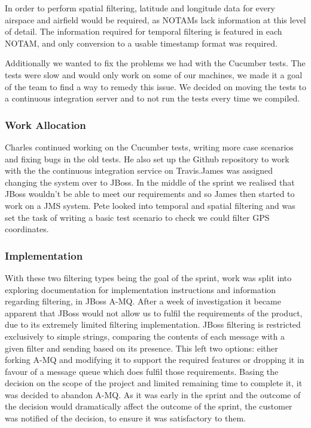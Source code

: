\documentclass[a4paper, 12pt]{article}
\begin{document}
In order to perform spatial filtering, latitude and longitude data for every airspace and airfield would be required, as NOTAMs lack information at this level of detail. The information required for temporal filtering is featured in each NOTAM, and only conversion to a usable timestamp format was required.

Additionally we wanted to fix the problems we had with the Cucumber tests. The tests were slow and would only work on some of our machines, we made it a goal of the team to find a way to remedy this issue. We decided on moving the tests to a continuous integration server and to not run the tests every time we compiled.

\subsubsection{Work Allocation}

Charles continued working on the Cucumber tests, writing more case scenarios and fixing bugs in the old tests. He also set up the Github repository to work with the the continuous integration service on Travis.James was assigned changing the system over to JBoss. In the middle of the sprint we realised that JBoss wouldn't be able to meet our requirements and so James then started to work on a JMS system. Pete looked into temporal and spatial filtering and was set the task of writing a basic test scenario to check we could filter GPS coordinates.

\subsubsection{Implementation}

With these two filtering types being the goal of the sprint, work was split into exploring documentation for implementation instructions and information regarding filtering, in JBoss A-MQ. After a week of investigation it became apparent that JBoss would not allow us to fulfil the requirements of the product, due to its extremely limited filtering implementation. JBoss filtering is restricted exclusively to simple strings, comparing the contents of each message with a given filter and sending based on its presence. This left two options: either forking A-MQ and modifying it to support the required features or dropping it in favour of a message queue which does fulfil those requirements. Basing the decision on the scope of the project and limited remaining time to complete it, it was decided to abandon A-MQ. As it was early in the sprint and the outcome of the decision would dramatically affect the outcome of the sprint, the customer was notified of the decision, to ensure it was satisfactory to them.
\end{document}
